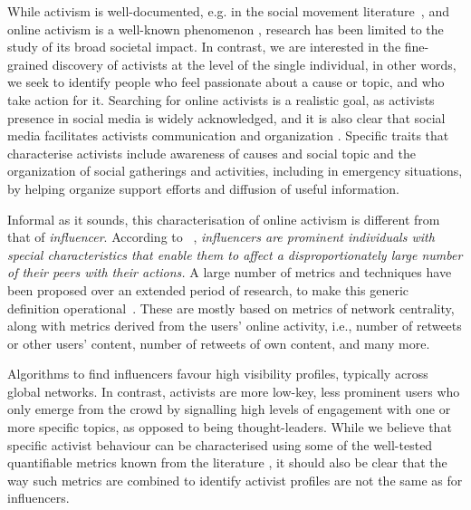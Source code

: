 \documentclass[runningheads]{llncs}
\begin{document}
While activism is well-documented, e.g. in the social movement literature~\cite{doi:10.1080/14742830701497277}, and online activism is a well-known phenomenon \cite{IJoC1246}, research has been limited to the study of its broad societal impact. 
In contrast, we are interested in the fine-grained discovery of activists at the level of the single individual, in other words, we seek to identify people who feel passionate about a cause or topic, and who take action for it. 
Searching for online activists is a realistic goal, as activists presence in social media is widely acknowledged, and it is also clear that social media facilitates activists communication and organization \cite{Poell2014,Youmans2012}.  
Specific traits that characterise activists include awareness of causes and social topic and the organization of social gatherings and activities, including in emergency situations, by helping organize support efforts and diffusion of useful information.
 
Informal as it sounds, this characterisation of online activism is different from that of \textit{influencer}.
According to ~\cite{Kardara2015}, \textit{influencers are prominent individuals with special characteristics that enable them to	affect a disproportionately large number of their peers with their actions.}
A large number of metrics and techniques have been proposed over an extended period of research, to make this generic definition operational~\cite{RIQUELME2016949}. These are mostly based on metrics of network centrality, along with metrics derived from the users' online activity, i.e., number of retweets or other users' content, number of retweets of own content, and many more.

Algorithms to find influencers favour high visibility profiles, typically across global networks.
In contrast, activists are more low-key, less prominent users who only emerge from the crowd by signalling high levels of engagement with one or more specific topics, as opposed to being thought-leaders.
%
While we believe that specific activist behaviour can be characterised using some of the well-tested quantifiable metrics known from the literature \cite{COMMON-METRICS}, it should also be clear that the way such metrics are combined to identify activist profiles are not the same as for influencers. 
\end{document}
